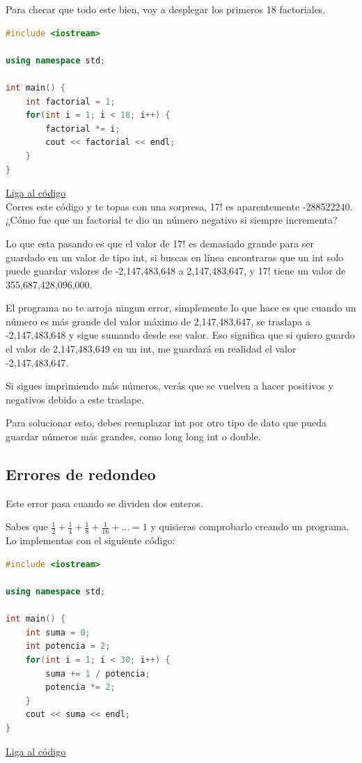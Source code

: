 \documentclass{article}
\begin{document}
Para checar que todo este bien, voy a desplegar los primeros 18 factoriales.

\begin{lstlisting}[language=C++, caption=Sobreflujo]
#include <iostream>

using namespace std;

int main() {
    int factorial = 1;
    for(int i = 1; i < 18; i++) {
        factorial *= i;
        cout << factorial << endl;
    }
}
\end{lstlisting}
\href{https://repl.it/@Jamesscn/Sobrefactorial}{Liga al código}\\

Corres este código y te topas con una sorpresa, 17! es aparentemente -288522240. ¿Cómo fue que un factorial te dio un número negativo si siempre incrementa?

Lo que esta pasando es que el valor de 17! es demasiado grande para ser guardado en un valor de tipo int, si buscas en línea encontraras que un int solo puede guardar valores de -2,147,483,648 a 2,147,483,647, y 17! tiene un valor de 355,687,428,096,000.

El programa no te arroja ningun error, simplemente lo que hace es que cuando un número es más grande del valor máximo de 2,147,483,647, se traslapa a -2,147,483,648 y sigue sumando desde ese valor. Eso significa que si quiero guardo el valor de 2,147,483,649 en un int, me guardará en realidad el valor -2,147,483,647.

Si sigues imprimiendo más números, verás que se vuelven a hacer positivos y negativos debido a este traslape.

Para solucionar esto, debes reemplazar int por otro tipo de dato que pueda guardar números más grandes, como long long int o double.

\subsection{Errores de redondeo}
Este error pasa cuando se dividen dos enteros.

Sabes que $\frac{1}{2} + \frac{1}{4} + \frac{1}{8} + \frac{1}{16} + ... = 1$ y quisieras comprobarlo creando un programa. Lo implementas con el siguiente código:

\begin{lstlisting}[language=C++, caption=Error de redondeo]
#include <iostream>

using namespace std;

int main() {
    int suma = 0;
    int potencia = 2;
    for(int i = 1; i < 30; i++) {
        suma += 1 / potencia;
        potencia *= 2;
    }
    cout << suma << endl;
}
\end{lstlisting}
\href{https://repl.it/@Jamesscn/Suma-Fraccional}{Liga al código}\\
\end{document}
